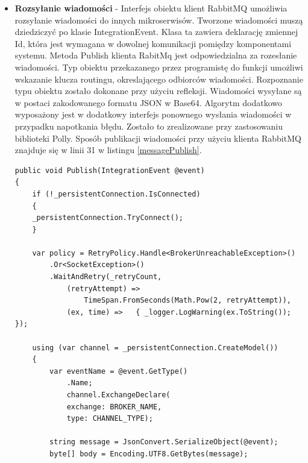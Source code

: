 \begin{itemize}
\begin{lstlisting}[caption=Akcja zapisu zdjęcia.]
[HttpPost("")]
public async Task<IActionResult> Create(IFormFile file)
{
	if (file == null)
	{
		return BadRequest();
	}
	var userId = int.Parse(_userManager.GetUserId(User));
	var result = await _photoService.Create(file, userId);
	await _photoService.SaveChanges();
	
	var integrationEvent = 
		_mapper.Map<ImageClasificationEvent>(result);
	_eventBus.Publish(integrationEvent);
	
	return Ok(new { id = result.Id });
}
\end{lstlisting} 

\item \textbf{Rozsyłanie wiadomości} - Interfejs obiektu klient RabbitMQ umożliwia  rozsyłanie wiadomości do innych mikroserwisów. Tworzone wiadomości muszą dziedziczyć po klasie IntegrationEvent. Klasa ta zawiera deklarację zmiennej Id, która jest wymagana w dowolnej komunikacji pomiędzy komponentami systemu. Metoda Publish klienta RabitMq jest odpowiedzialna za rozesłanie wiadomości. Typ obiektu przekazanego przez programistę do funkcji umożliwi wskazanie klucza routingu, okreslającego odbiorców wiadomości. Rozpoznanie typu obiektu zostało dokonane przy użyciu refleksji. Wiadomości wysyłane są w postaci zakodowanego formatu JSON w Base64. Algorytm dodatkowo wyposażony jest w dodatkowy interfejs ponownego wysłania wiadomości w przypadku napotkania błędu. Zostało to zrealizowane przy zastosowaniu biblioteki Polly. Sposób publikacji wiadomości przy użyciu klienta RabbitMQ znajduje się w linii 31 w listingu \ref{messagePublish}. 
\newpage

\begin{lstlisting}[caption={Metoda publikacji wiadomości.}, label={messagePublish}]
public void Publish(IntegrationEvent @event)
{
	if (!_persistentConnection.IsConnected)
	{
	_persistentConnection.TryConnect();
	}

	var policy = RetryPolicy.Handle<BrokerUnreachableException>()
		.Or<SocketException>()
		.WaitAndRetry(_retryCount, 
			(retryAttempt) => 
				TimeSpan.FromSeconds(Math.Pow(2, retryAttempt)), 
			(ex, time) =>	{ _logger.LogWarning(ex.ToString()); });

	using (var channel = _persistentConnection.CreateModel())
	{
		var eventName = @event.GetType()
			.Name;
			channel.ExchangeDeclare(
			exchange: BROKER_NAME,
			type: CHANNEL_TYPE);                
	
		string message = JsonConvert.SerializeObject(@event);
		byte[] body = Encoding.UTF8.GetBytes(message);
	

\end{lstlisting}
\end{itemize}
